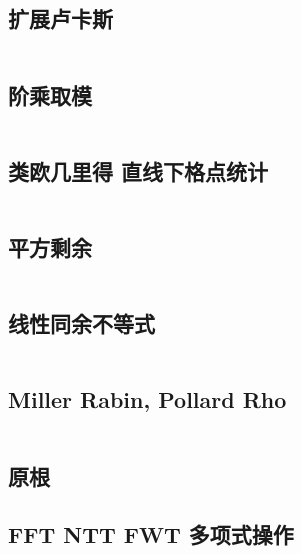 \documentclass[titlepage, a4paper]{article}
\newcommand\nothing{}
\renewcommand{\checkmark}[0]{\nothing}
\begin{document}
\begin{multicols}{2}
\begin{spacing}{0.6}
				\subsection{扩展卢卡斯}
				\inputminted{cpp}{src/Math/扩展卢卡斯.cpp}
				\subsection{阶乘取模}
				\inputminted{cpp}{src/Math/Factorial Mod.cpp}
				\subsection{类欧几里得 直线下格点统计\checkmark}
				\inputminted{cpp}{src/Math/直线下格点统计.cpp}
				\subsection{平方剩余}
				\inputminted{cpp}{src/Math/平方剩余.cpp}
				\subsection{线性同余不等式}
				\inputminted{cpp}{src/Math/线性同余不等式.cpp}
				\subsection{Miller Rabin, Pollard Rho}
				\inputminted{cpp}{src/Math/Miller Rabin And Pollard Rho.cpp}
				\subsection{原根}
				
				\subsection{FFT NTT FWT 多项式操作}
				\inputminted{cpp}{src/Math/FFT NTT FWT.cpp}

\end{spacing}
\end{multicols}
\end{document}
